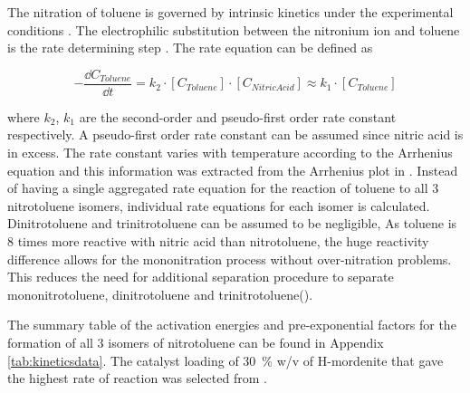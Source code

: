 
The nitration of toluene is governed by intrinsic kinetics under the experimental conditions \cite{jeeru_kinetics_2018}. The electrophilic substitution between the  nitronium ion and toluene is the rate determining step \cite{carey_advanced_2007}. The rate equation can be defined as  

\begin{equation}
-\frac{\dd C_{Toluene}}{\dd t} = k_{2} \cdot [C_{Toluene}] \cdot [C_{Nitric Acid}] \approx k_{1} \cdot [C_{Toluene}]
\end{equation}

where $k_2$, $k_1$ are the second-order and pseudo-first order rate constant respectively. A pseudo-first order rate constant can be assumed since nitric acid is in excess. The rate constant varies with temperature according to the Arrhenius equation and this information was extracted from the Arrhenius plot in \textcite{jeeru_kinetics_2018}. Instead of having a single aggregated rate equation for the reaction of toluene to all 3 nitrotoluene isomers, individual rate equations for each isomer is calculated. Dinitrotoluene and trinitrotoluene can be assumed to be negligible,
As toluene is 8 times more reactive with nitric acid than nitrotoluene, the huge reactivity difference allows for the mononitration process without over-nitration problems. This reduces the need for additional separation procedure to separate mononitrotoluene, dinitrotoluene and trinitrotoluene().

The summary table of the activation energies and pre-exponential factors for the formation of all 3 isomers of nitrotoluene can be found in Appendix \ref{tab:kineticsdata}. The catalyst loading of \SI{30}{\%} w/v of H-mordenite that gave the highest rate of reaction was selected from \textcite{jeeru_kinetics_2018}.




